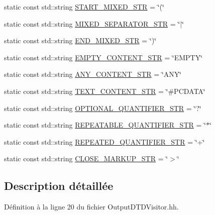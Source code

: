 \begin{DoxyCompactItemize}
\item 
static const std::string \hyperlink{classdtd_1_1_output_d_t_d_visitor_a254da51819583f6fd4501521f741042d}{START\_\-MIXED\_\-STR} = \char`\"{}(\char`\"{}
\item 
static const std::string \hyperlink{classdtd_1_1_output_d_t_d_visitor_af583c776fabca5615d43da966dca600c}{MIXED\_\-SEPARATOR\_\-STR} = \char`\"{}$|$\char`\"{}
\item 
static const std::string \hyperlink{classdtd_1_1_output_d_t_d_visitor_a217915df1bfe131dae99679461140fcc}{END\_\-MIXED\_\-STR} = \char`\"{})\char`\"{}
\item 
static const std::string \hyperlink{classdtd_1_1_output_d_t_d_visitor_af77ea7a3f4f05a3b3fea5a58a7d6de53}{EMPTY\_\-CONTENT\_\-STR} = \char`\"{}EMPTY\char`\"{}
\item 
static const std::string \hyperlink{classdtd_1_1_output_d_t_d_visitor_a4f8609bcd2c8c20d1de80081835c48fc}{ANY\_\-CONTENT\_\-STR} = \char`\"{}ANY\char`\"{}
\item 
static const std::string \hyperlink{classdtd_1_1_output_d_t_d_visitor_a83f802e6ceef88d9496b0aedf4d4541e}{TEXT\_\-CONTENT\_\-STR} = \char`\"{}\#PCDATA\char`\"{}
\item 
static const std::string \hyperlink{classdtd_1_1_output_d_t_d_visitor_a98f9105b5bccb426bc8a6e907a67b17f}{OPTIONAL\_\-QUANTIFIER\_\-STR} = \char`\"{}?\char`\"{}
\item 
static const std::string \hyperlink{classdtd_1_1_output_d_t_d_visitor_a4041af52751607ff7ae188484d962d95}{REPEATABLE\_\-QUANTIFIER\_\-STR} = \char`\"{}$\ast$\char`\"{}
\item 
static const std::string \hyperlink{classdtd_1_1_output_d_t_d_visitor_ae8c6ec6c1f6ae17d8705be7267b07a2f}{REPEATED\_\-QUANTIFIER\_\-STR} = \char`\"{}+\char`\"{}
\item 
static const std::string \hyperlink{classdtd_1_1_output_d_t_d_visitor_a4dbe0d3fda6b73977f28488cf2f9cff4}{CLOSE\_\-MARKUP\_\-STR} = \char`\"{}$>$\char`\"{}
\end{DoxyCompactItemize}


\subsection{Description détaillée}


Définition à la ligne 20 du fichier OutputDTDVisitor.hh.



